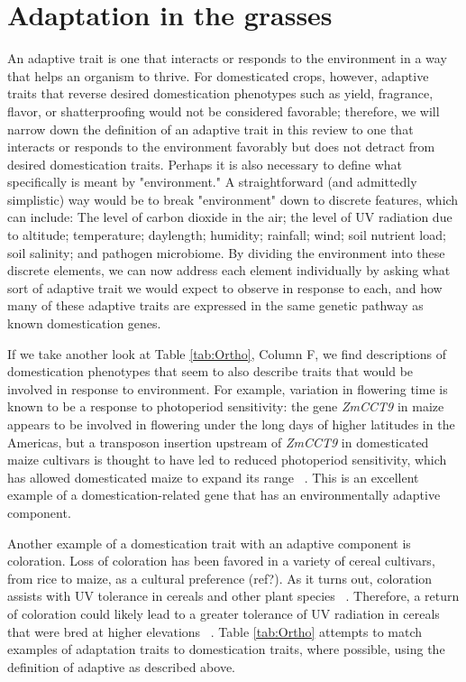 \documentclass[12pt]{article}
\begin{document}
\section*{Adaptation in the grasses}
An adaptive trait is one that interacts or responds to the environment in a way that helps an organism to thrive. For domesticated crops, however, adaptive traits that reverse desired domestication phenotypes such as yield, fragrance, flavor, or shatterproofing would not be considered favorable; therefore, we will narrow down the definition of an adaptive trait in this review to one that interacts or responds to the environment favorably but does not detract from desired domestication traits.  Perhaps it is also necessary to define what specifically is meant by "environment." A straightforward (and admittedly simplistic) way would be to break  "environment" down to discrete features, which can include: The level of carbon dioxide in the air; the level of UV radiation due to altitude; temperature; daylength; humidity; rainfall; wind; soil nutrient load; soil salinity; and pathogen microbiome.  By dividing the environment into these discrete elements, we can now address each element individually by asking what sort of adaptive trait we would expect to observe in response to each, and how many of these adaptive traits are expressed in the same genetic pathway as known domestication genes. 

If we take another look at Table \ref{tab:Ortho}, Column F, we find descriptions of domestication phenotypes that seem to also describe traits that would be involved in response to environment. For example, variation in flowering time is known to be a response to photoperiod sensitivity: the gene \textit{ZmCCT9} in maize appears to be involved in flowering under the long days of higher latitudes in the Americas, but a transposon insertion upstream of \textit{ZmCCT9} in domesticated maize cultivars is thought to have led to reduced photoperiod sensitivity, which has allowed domesticated maize to expand its range ~\citep{Huang2017}.  This is an excellent example of a domestication-related gene that has an environmentally adaptive component. 

Another example of a domestication trait with an adaptive component is coloration. Loss of coloration has been favored in a variety of cereal cultivars, from rice to maize, as a cultural preference (ref?). As it turns out, coloration assists with UV tolerance in cereals and other plant species ~\citep{pmid8058838, Gould2004}. Therefore, a return of coloration could likely lead to a greater tolerance of UV radiation in cereals that were bred at higher elevations ~\citep{Pyhjrvi2013}.  Table \ref{tab:Ortho} attempts to match examples of adaptation traits to domestication traits, where possible, using the definition of adaptive as described above. 
\end{document}
